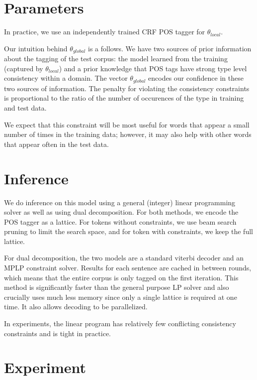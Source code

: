 \documentclass{article}
\newcommand{\thetal}{\theta_{local}}
\newcommand{\thetag}{\theta_{global}}
\begin{document}
\section{Parameters}

In practice, we use an independently trained CRF POS tagger for $\thetal$. 




Our intuition behind $\thetag$ is a follows. We have two sources of prior information about the tagging of the test corpus: the model learned from the training (captured by $\thetal$) and a prior knowledge that POS tags have strong type level consistency within a domain. The vector $\thetag$ encodes our confidence in these two sources of information. The penalty for violating the consistency constraints is proportional to the ratio of the number of occurences of the type in training and test data. 

We expect that this constraint will be most useful for words that appear a small number of times in the training data; however, it may also help with other words that appear often in the test data. 


\section{Inference}

We do inference on this model using a general (integer) linear programming solver as well as using dual decomposition. For both methods, we encode the POS tagger as a lattice. For tokens without constraints, we use beam search pruning to limit the search space, and for token with constraints, we keep the full lattice.

For dual decomposition, the two models are a standard viterbi decoder and an MPLP constraint solver. Results for each sentence are cached in between rounds, which means that the entire corpus is only tagged on the first iteration. This method is significantly faster than the general purpose LP solver and also crucially uses much less memory since only a single lattice is required at one time. It also allows decoding to be parallelized.

In experiments, the linear program has relatively few conflicting consistency constraints and is tight in practice.

 

\section{Experiment}
\end{document}
